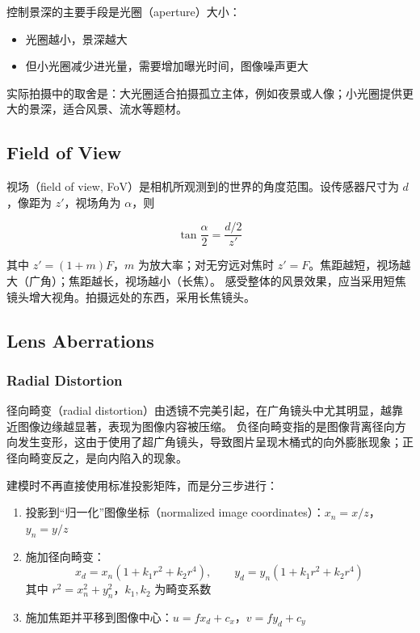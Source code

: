 控制景深的主要手段是光圈（aperture）大小：

\begin{itemize}
    \item 光圈越小，景深越大
    \item 但小光圈减少进光量，需要增加曝光时间，图像噪声更大
\end{itemize}

实际拍摄中的取舍是：大光圈适合拍摄孤立主体，例如夜景或人像；小光圈提供更大的景深，适合风景、流水等题材。

\subsection{Field of View}

视场（field of view, FoV）是相机所观测到的世界的角度范围。设传感器尺寸为 $d$，像距为 $z'$，视场角为 $\alpha$，则

\[
\tan\frac{\alpha}{2} = \frac{d/2}{z'}
\]

其中 $z' = (1+m)F$，$m$ 为放大率；对无穷远对焦时 $z' = F$。焦距越短，视场越大（广角）；焦距越长，视场越小（长焦）。
感受整体的风景效果，应当采用短焦镜头增大视角。拍摄远处的东西，采用长焦镜头。

\subsection{Lens Aberrations}

\subsubsection{Radial Distortion}

径向畸变（radial distortion）由透镜不完美引起，在广角镜头中尤其明显，越靠近图像边缘越显著，表现为图像内容被压缩。
负径向畸变指的是图像背离径向方向发生变形，这由于使用了超广角镜头，导致图片呈现木桶式的向外膨胀现象；正径向畸变反之，是向内陷入的现象。

建模时不再直接使用标准投影矩阵，而是分三步进行：

\begin{enumerate}
    \item 投影到“归一化”图像坐标（normalized image coordinates）：$x_n = x/z$，$y_n = y/z$
    \item 施加径向畸变：
    \[
    x_d = x_n\left(1 + k_1 r^2 + k_2 r^4\right), \qquad
    y_d = y_n\left(1 + k_1 r^2 + k_2 r^4\right)
    \]
    其中 $r^2 = x_n^2 + y_n^2$，$k_1, k_2$ 为畸变系数
    \item 施加焦距并平移到图像中心：$u = f x_d + c_x$，$v = f y_d + c_y$
\end{enumerate}

